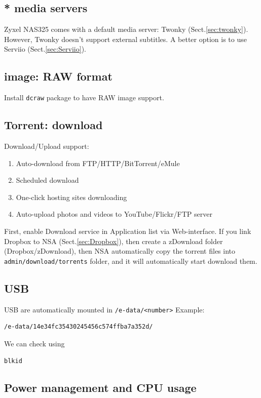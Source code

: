 \subsection{* media servers}

Zyxel NAS325 comes with a default media server: Twonky (Sect.\ref{sec:twonky}).
However, Twonky doesn't support external subtitles. A better option is to use
Serviio (Sect.\ref{sec:Serviio}).

\subsection{image: RAW format}

Install \verb!dcraw! package to have RAW image support. 

\subsection{Torrent: download}

Download/Upload support:
\begin{enumerate}
\item  Auto-download from FTP/HTTP/BitTorrent/eMule
\item Scheduled download
\item One-click hosting sites downloading
\item Auto-upload photos and videos to YouTube/Flickr/FTP server  
\end{enumerate}

First, enable Download service in Application list via Web-interface.
If you link Dropbox to NSA (Sect.\ref{sec:Dropbox}), then create a zDownload
folder (Dropbox/zDownload), then NSA automatically copy the torrent files into
\verb!admin/download/torrents! folder, and it will automatically start download
them.


\subsection{USB}

USB are automatically mounted in \verb!/e-data/<number>!
Example:
\begin{verbatim}
/e-data/14e34fc35430245456c574ffba7a352d/
\end{verbatim}

We can check using 
\begin{verbatim}
blkid
\end{verbatim}

\subsection{Power management and CPU usage}

